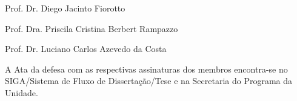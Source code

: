 \begin{center}
  Prof. Dr. Diego Jacinto Fiorotto
\end{center}

\vspace{5cm}

\begin{center}
Prof. Dra. Priscila Cristina Berbert Rampazzo
\end{center}

\vspace{5cm}

\begin{center}
Prof. Dr. Luciano Carlos Azevedo da Costa
\end{center}

\vspace{6cm}

\begin{center}
A Ata da defesa com as respectivas assinaturas dos membros encontra-se no SIGA/Sistema de Fluxo de Dissertação/Tese e na Secretaria do Programa da Unidade.
\end{center}




